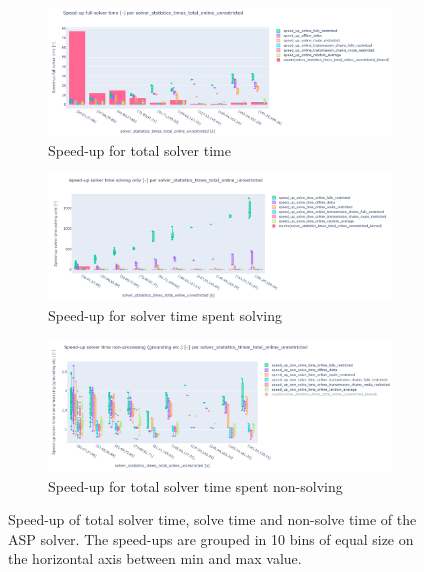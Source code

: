 \documentclass{article}
\begin{document}
\begin{figure}[hbtp]

     \begin{subfigure}{\textwidth}
        \includegraphics[width=\textwidth]{Figures/04_computational_results/speed_up_times_total_per_times_total_online_unrestricted.PNG}
        \caption{Speed-up for total solver time}
         \label{fig:computationtimes_speed_up_total}
    \end{subfigure}
     \begin{subfigure}{\textwidth}
        \includegraphics[width=\textwidth]{Figures/04_computational_results/speed_up_solve_time_per_times_total_online_unrestricted.PNG}
        \caption{Speed-up for solver time spent solving}
         \label{fig:computationtimes_speed_up_solve_time}
    \end{subfigure}
    \begin{subfigure}{\textwidth}
        \includegraphics[width=\textwidth]{Figures/04_computational_results/speed_up_non_solve_time_per_times_total_online_unrestricted.PNG}
        \caption{Speed-up for total solver time spent non-solving}
         \label{fig:computationtimes_speed_up_non_solve_time}
    \end{subfigure}
	\caption{Speed-up of total solver time, solve time and non-solve time of the ASP solver. The speed-ups are grouped in 10 bins of equal size on the horizontal axis between min and max value.}
	\label{fig:speed_up}
\end{figure}
\end{document}
